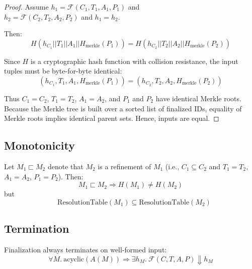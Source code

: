 \documentclass[sigplan,screen]{acmart}
\begin{document}
\begin{proof}
Assume $h_1 = \mathcal{F}(C_1, T_1, A_1, P_1)$ and \\$h_2 = \mathcal{F}(C_2, T_2, A_2, P_2)$ and $h_1 = h_2$.

Then:
\[
H(h_{C_1} || T_1 || A_1 || H_{\text{merkle}}(P_1)) = H(h_{C_2} || T_2 || A_2 || H_{\text{merkle}}(P_2))
\]

Since $H$ is a cryptographic hash function with collision resistance, the input tuples must be byte-for-byte identical:
\[
(h_{C_1}, T_1, A_1, H_{\text{merkle}}(P_1)) = (h_{C_2}, T_2, A_2, H_{\text{merkle}}(P_2))
\]

Thus $C_1 = C_2$, $T_1 = T_2$, $A_1 = A_2$, and $P_1$ and $P_2$ have identical Merkle roots. Because the Merkle tree is built over a sorted list of finalized IDs, equality of Merkle roots implies identical parent sets. Hence, inputs are equal.
\end{proof}

\subsection{Monotonicity}
\label{appendix:monotonicity}

\begin{theorem}
\label{thm:monotonicity}
Let $M_1 \sqsubset M_2$ denote that $M_2$ is a refinement of $M_1$ (i.e., $C_1 \subseteq C_2$ and $T_1 = T_2$, $A_1 = A_2$, $P_1 = P_2$). Then:
\[
M_1 \sqsubset M_2 \Rightarrow H(M_1) \neq H(M_2)
\]
but
\[
\quad \text{ResolutionTable}(M_1) \subseteq \text{ResolutionTable}(M_2)
\]
\end{theorem}

\subsection{Termination}
\label{appendix:termination}

\begin{theorem}
\label{thm:termination}
Finalization always terminates on well-formed input:
\[
\forall M.\ \text{acyclic}(A(M)) \Rightarrow \exists h_M.\ \mathcal{F}(C, T, A, P) \Downarrow h_M
\]
\end{theorem}
\end{document}

